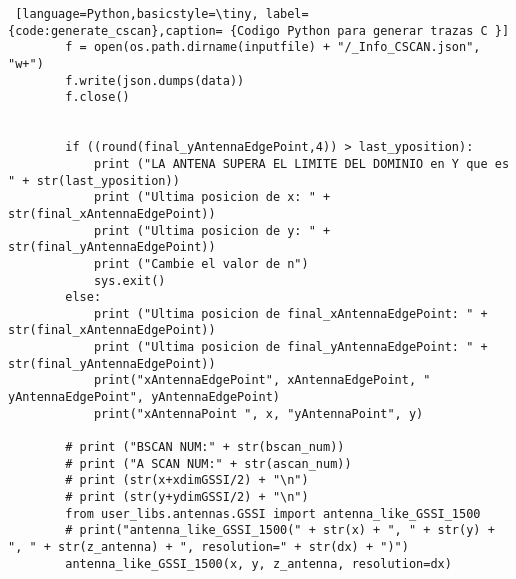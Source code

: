 \begin{lstlisting} [language=Python,basicstyle=\tiny, label={code:generate_cscan},caption= {Codigo Python para generar trazas C }]
        f = open(os.path.dirname(inputfile) + "/_Info_CSCAN.json", "w+")
        f.write(json.dumps(data))
        f.close()


        if ((round(final_yAntennaEdgePoint,4)) > last_yposition):
            print ("LA ANTENA SUPERA EL LIMITE DEL DOMINIO en Y que es " + str(last_yposition))
            print ("Ultima posicion de x: " + str(final_xAntennaEdgePoint))
            print ("Ultima posicion de y: " + str(final_yAntennaEdgePoint))
            print ("Cambie el valor de n")
            sys.exit()
        else:
            print ("Ultima posicion de final_xAntennaEdgePoint: " + str(final_xAntennaEdgePoint))
            print ("Ultima posicion de final_yAntennaEdgePoint: " + str(final_yAntennaEdgePoint))
            print("xAntennaEdgePoint", xAntennaEdgePoint, " yAntennaEdgePoint", yAntennaEdgePoint)
            print("xAntennaPoint ", x, "yAntennaPoint", y)

        # print ("BSCAN NUM:" + str(bscan_num))
        # print ("A SCAN NUM:" + str(ascan_num))
        # print (str(x+xdimGSSI/2) + "\n")
        # print (str(y+ydimGSSI/2) + "\n")
        from user_libs.antennas.GSSI import antenna_like_GSSI_1500
        # print("antenna_like_GSSI_1500(" + str(x) + ", " + str(y) + ", " + str(z_antenna) + ", resolution=" + str(dx) + ")")
        antenna_like_GSSI_1500(x, y, z_antenna, resolution=dx)
\end{lstlisting}
\newpage



